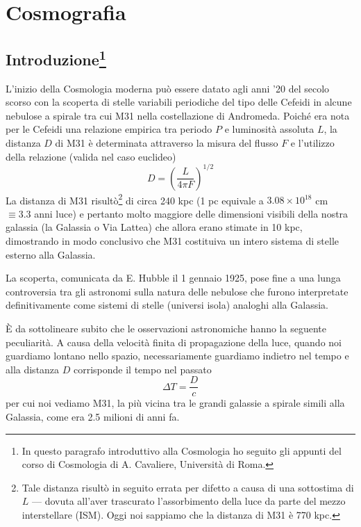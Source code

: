 \chapter{Cosmografia}
\label{cha:cosmografia}

\section[Introduzione]{Introduzione\footnote{In questo paragrafo introduttivo
    alla Cosmologia ho seguito gli appunti del corso di Cosmologia di
    A. Cavaliere, Università di Roma.}}

L'inizio della Cosmologia moderna può essere datato agli anni '20 del secolo
scorso con la scoperta di stelle variabili periodiche del tipo delle Cefeidi in
alcune nebulose a spirale tra cui M31 nella costellazione di Andromeda.  Poiché
era nota per le Cefeidi una relazione empirica tra periodo $P$ e luminosità
assoluta $L$, la distanza $D$ di M31 è determinata attraverso la misura del
flusso $F$ e l'utilizzo della relazione (valida nel caso euclideo)
\begin{equation}
  D=\left( \frac{L}{4 \pi F} \right)^{1/2}
\end{equation}
La distanza di M31 risultò\footnote{Tale distanza risultò in seguito errata per
  difetto a causa di una sottostima di $L$ --- dovuta all'aver trascurato
  l'assorbimento della luce da parte del mezzo interstellare (ISM).  Oggi noi
  sappiamo che la distanza di M31 è 770 kpc.} di circa 240 kpc (1 pc equivale a
$3.08 \times 10^{18}$ cm $\equiv 3.3$ anni luce) e pertanto molto maggiore delle
dimensioni visibili della nostra galassia (la Galassia o Via Lattea) che allora
erano stimate in 10 kpc, dimostrando in modo conclusivo che M31 costituiva un
intero sistema di stelle esterno alla Galassia.

La scoperta, comunicata da E. Hubble il 1 gennaio 1925, pose fine a una lunga
controversia tra gli astronomi sulla natura delle nebulose che furono
interpretate definitivamente come sistemi di stelle (universi isola) analoghi
alla Galassia.

È da sottolineare subito che le osservazioni astronomiche hanno la seguente
peculiarità.  A causa della velocità finita di propagazione della luce, quando
noi guardiamo lontano nello spazio, necessariamente guardiamo indietro nel tempo
e alla distanza $D$ corrisponde il tempo nel passato
\begin{equation}
  \Delta T = \frac{D}{c}
\end{equation}
per cui noi vediamo M31, la più vicina tra le grandi galassie a spirale simili
alla Galassia, come era 2.5 milioni di anni fa.

